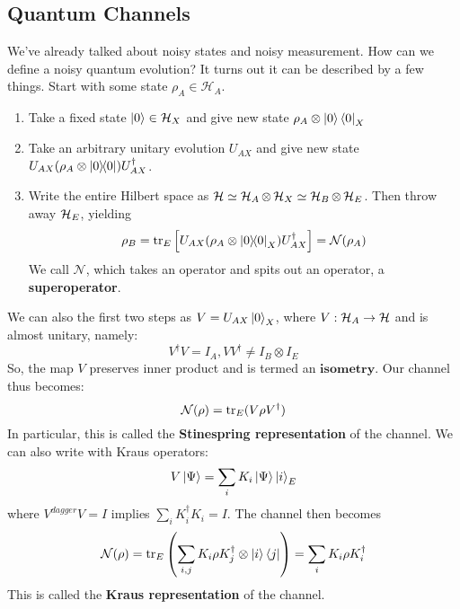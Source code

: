 \subsection{Quantum Channels}
We've already talked about noisy states and noisy measurement. How can we define a noisy quantum evolution? It turns out it can be described by a few things. Start with
some state $\rho_A \in \mathcal{H}_A$.
\begin{enumerate}
    \item Take a fixed state $\ket{0} \in \mathcal{H}_X$ and give new state $\rho_A \otimes \ket{0}\bra{0}_X$
    \item Take an arbitrary unitary evolution $U_{AX}$ and give new state $U_{AX}\qty(\rho_A \otimes \ketbra{0}) U_{AX}^{\dagger}$.
    \item Write the entire Hilbert space as $\operatorname{\mathcal{H}} \simeq \operatorname{\mathcal{H}}_A \otimes \operatorname{\mathcal{H}}_X \simeq \operatorname{\mathcal{H}}_B \otimes \operatorname{\mathcal{H}}_E$. Then throw away $\operatorname{\mathcal{H}}_E$, yielding
    \[ \rho_B = \tr_E\qty[U_{AX} (\rho_A \otimes \ketbra{0}_X) U_{AX}^{\dagger}] = \mathcal{N}(\rho_A) \]
    We call $\mathcal{N}$, which takes an operator and spits out an operator, a \textbf{superoperator}.
\end{enumerate}
We can also the first two steps as $V = U_{AX} \ket{0}_X$, where $V: \operatorname{\mathcal{H}}_A \to \operatorname{\mathcal{H}}$ and is almost unitary, namely:
\[ V^{\dagger} V = I_A, VV^{\dagger} \neq I_B \otimes I_E \]
So, the map $V$ preserves inner product and is termed an $\textbf{isometry}$. Our channel thus becomes:
\[ \mathcal{N}(\rho) = \tr_E(V \rho V^{\dagger}) \]
In particular, this is called the \textbf{Stinespring representation} of the channel. We can also write with Kraus operators:
\[ V \ket{\Psi}  = \sum_i K_i \ket{\Psi} \ket{i}_E \]
where $V^{dagger}V = I$ implies $\sum_i K_i^{\dagger} K_i = I$. The channel then becomes
\[ \mathcal{N}(\rho) = \tr_E\qty(\sum_{i, j} K_i \rho K_j^{\dagger} \otimes \ket{i}\bra{j}) = \sum_i K_i \rho K_i^{\dagger} \]
This is called the \textbf{Kraus representation} of the channel.

